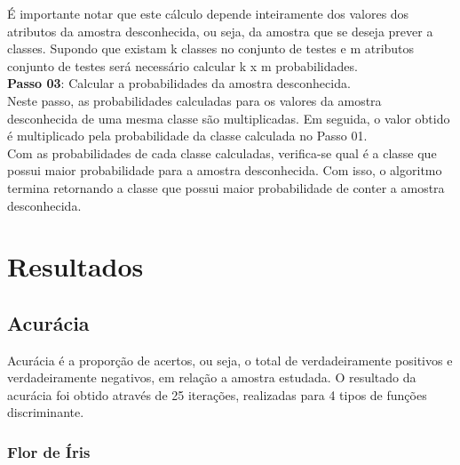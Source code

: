 \documentclass[a4paper]{article}
\begin{document}
É importante notar que este cálculo depende inteiramente dos valores dos atributos da amostra desconhecida, ou seja, da amostra que se deseja prever a classes. Supondo que existam k classes no conjunto de testes e m atributos conjunto de testes será necessário calcular k x m probabilidades.\\

\textbf{Passo 03}: Calcular a probabilidades da amostra desconhecida.\\

Neste passo, as probabilidades calculadas para os valores da amostra desconhecida de uma mesma classe são multiplicadas. Em seguida, o valor obtido é multiplicado pela probabilidade da classe calculada no Passo 01.\\

Com as probabilidades de cada classe calculadas, verifica-se qual é a classe que possui maior probabilidade para a amostra desconhecida. Com isso, o algoritmo termina retornando a classe que possui maior probabilidade de conter a amostra desconhecida.


\section{Resultados}

\subsection{Acurácia}


Acurácia é a proporção de acertos, ou seja, o total de verdadeiramente positivos e verdadeiramente negativos, em relação a amostra estudada. O resultado da acurácia foi obtido através de 25 iterações, realizadas para 4 tipos de funções discriminante. \\

\subsubsection{Flor de Íris}
\end{document}
